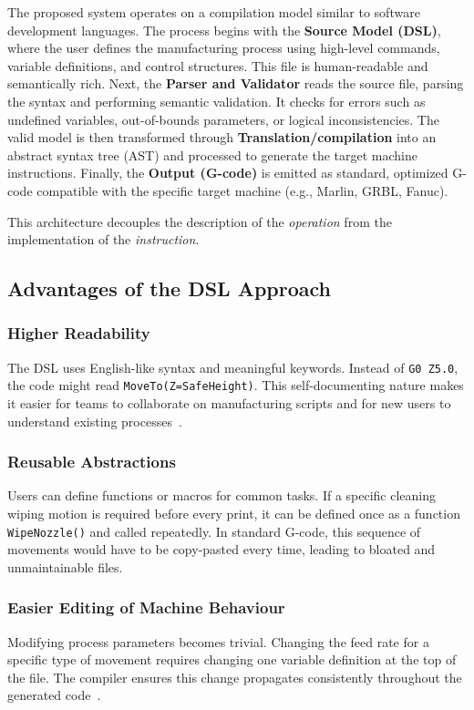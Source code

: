 The proposed system operates on a compilation model similar to software development languages. The process begins with the \textbf{Source Model (DSL)}, where the user defines the manufacturing process using high-level commands, variable definitions, and control structures. This file is human-readable and semantically rich. Next, the \textbf{Parser and Validator} reads the source file, parsing the syntax and performing semantic validation. It checks for errors such as undefined variables, out-of-bounds parameters, or logical inconsistencies. The valid model is then transformed through \textbf{Translation/compilation} into an abstract syntax tree (AST) and processed to generate the target machine instructions. Finally, the \textbf{Output (G-code)} is emitted as standard, optimized G-code compatible with the specific target machine (e.g., Marlin, GRBL, Fanuc).

This architecture decouples the description of the \textit{operation} from the implementation of the \textit{instruction}.

\subsection{Advantages of the DSL Approach}

\subsubsection{Higher Readability}
The DSL uses English-like syntax and meaningful keywords. Instead of \texttt{G0 Z5.0}, the code might read \texttt{MoveTo(Z=SafeHeight)}. This self-documenting nature makes it easier for teams to collaborate on manufacturing scripts and for new users to understand existing processes~\cite{zhang_still_2026}.

\subsubsection{Reusable Abstractions}
Users can define functions or macros for common tasks. If a specific cleaning wiping motion is required before every print, it can be defined once as a function \texttt{WipeNozzle()} and called repeatedly. In standard G-code, this sequence of movements would have to be copy-pasted every time, leading to bloated and unmaintainable files.

\subsubsection{Easier Editing of Machine Behaviour}
Modifying process parameters becomes trivial. Changing the feed rate for a specific type of movement requires changing one variable definition at the top of the file. The compiler ensures this change propagates consistently throughout the generated code~\cite{abdelaal_gllm_2025}.

